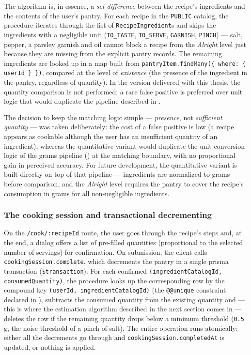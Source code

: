 The algorithm is, in essence, a \textit{set difference} between the recipe's ingredients and the contents of the user's pantry. For each recipe in the \texttt{PUBLIC} catalog, the procedure iterates through the list of \texttt{RecipeIngredient}s and skips the ingredients with a negligible unit (\texttt{TO\_TASTE}, \texttt{TO\_SERVE}, \texttt{GARNISH}, \texttt{PINCH}) --- salt, pepper, a parsley garnish and oil cannot block a recipe from the \textit{Alright} level just because they are missing from the explicit pantry records. The remaining ingredients are looked up in a map built from \texttt{pantryItem.findMany(\{ where: \{ userId \} \})}, compared at the level of \textit{existence} (the presence of the ingredient in the pantry, regardless of quantity). In the version delivered with this thesis, the quantity comparison is not performed; a rare false positive is preferred over unit logic that would duplicate the pipeline described in .

The decision to keep the matching logic simple --- \textit{presence}, not \textit{sufficient quantity} --- was taken deliberately: the cost of a false positive is low (a recipe appears as cookable although the user has an insufficient quantity of an ingredient), whereas the quantitative variant would duplicate the unit conversion logic of the grams pipeline () at the matching boundary, with no proportional gain in perceived accuracy. For future development, the quantitative variant is built directly on top of that pipeline --- ingredients are normalized to grams before comparison, and the \textit{Alright} level requires the pantry to cover the recipe's consumption in grams for all non-negligible ingredients.

\subsubsection{The cooking session and transactional decrementing}\label{subsec:sesiune-gatit}

On the \texttt{/cook/:recipeId} route, the user goes through the recipe's steps and, at the end, a dialog offers a list of pre-filled quantities (proportional to the selected number of servings) for confirmation. On submission, the client calls \texttt{cookingSession.complete}, which decrements the pantry in a single \gls{prisma} transaction (\texttt{\$transaction}). For each confirmed \texttt{(ingredientCatalogId, consumedQuantity)}, the procedure looks up the corresponding row by the compound key \texttt{(userId, ingredientCatalogId)} (the \texttt{@@unique} constraint declared in ), subtracts the consumed quantity from the existing quantity and --- this is where the estimation algorithm described in the next section comes in --- deletes the row if the remaining quantity drops below a minimum threshold (\texttt{0.5} g, the noise threshold of a pinch of salt). The entire operation runs atomically: either all the decrements go through and \texttt{cookingSession.completedAt} is updated, or nothing is applied.

